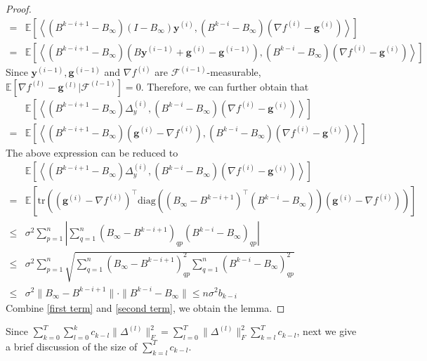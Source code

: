 \documentclass{article}
\newcommand{\vg}{{\mathbf{g}}}
\newcommand{\vy}{{\mathbf{y}}}
\newcommand{\cF}{{\mathcal{F}}}
\newcommand{\EE}[1]{\mathbb{E}\left[#1\right]}
\newcommand{\norm}[1]{\| #1 \|}
\newcommand{\ip}[1]{\left\langle#1\right\rangle}
\begin{document}
\begin{proof}
\begin{align*}
=&\EE{\ip{(B^{k-i+1}-B_{\infty})(I-B_{\infty})\vy^{(i)},(B^{k-i}-B_{\infty})(\nabla f^{(i)}-\vg^{(i)})}}\\ 
=&\EE{\ip{(B^{k-i+1}-B_{\infty})(B\vy^{(i-1)}+\vg^{(i)}-\vg^{(i-1)}),(B^{k-i}-B_{\infty})(\nabla f^{(i)}-\vg^{(i)})}}
\end{align*}
Since $\vy^{(i-1)}, \vg^{(i-1)}$ and $\nabla f^{(i)}$ are $\cF^{(i-1)}$-measurable, $\EE{\nabla f^{(l)}-\vg^{(l)}|\cF^{(l-1)}}=0$. Therefore, we can further obtain that 
\begin{align*}
  &\EE{\ip{(B^{k-i+1}-B_{\infty})\Delta_y^{(i)},(B^{k-i}-B_{\infty})(\nabla f^{(i)}-\vg^{(i)})}}\\ 
=&\EE{\ip{(B^{k-i+1}-B_{\infty})(\vg^{(i)}-\nabla f^{(i)}),(B^{k-i}-B_{\infty})(\nabla f^{(i)}-\vg^{(i)})}}
\end{align*}
The above expression can be reduced to 
\begin{align}
&\EE{\ip{(B^{k-i+1}-B_{\infty})\Delta_y^{(i)},(B^{k-i}-B_{\infty})(\nabla f^{(i)}-\vg^{(i)})}}\nonumber\\ 
=& \EE{\mathrm{tr}\left((\vg^{(i)}-\nabla f^{(i)})^\top\mathrm{diag}((B_\infty-B^{k-i+1})^\top(B^{k-i}-B_\infty))(\vg^{(i)}-\nabla f^{(i)})\right)}\nonumber\\ 
\leq &\sigma^2\sum_{p=1}^n\left\lvert\sum_{q=1}^n(B_\infty-B^{k-i+1})_{qp}(B^{k-i}-B_\infty)_{qp}\right\rvert\nonumber\\
\leq&\sigma^2\sum_{p=1}^n\sqrt{\sum_{q=1}^n(B_\infty-B^{k-i+1})_{qp}^2\sum_{q=1}^n(B^{k-i}-B_\infty)_{qp}^2}\nonumber\\
\leq&\sigma^2\norm{B_\infty-B^{k-i+1}}\cdot\norm{B^{k-i}-B_\infty} \le n\sigma^2b_{k-i}\label{second term}
\end{align}
Combine \ref{first term} and \ref{second term}, we obtain the lemma.
\end{proof}

Since $\sum_{k=0}^T\sum_{l=0}^k c_{k-l}\norm{\Delta^{(l)}}_F^2=\sum_{l=0}^T\norm{\Delta^{(l)}}_F^2\sum_{k=l}^Tc_{k-l}$, next we give a brief discussion of the size of $\sum_{k=l}^T c_{k-l}$.
\end{document}
